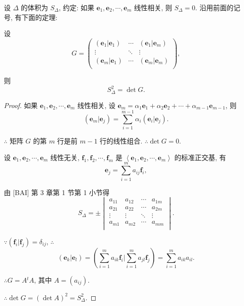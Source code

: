 \documentclass{ctexart}
\begin{document}
设 $\Delta$ 的体积为 $S_\Delta$, 约定: 如果 $\boldsymbol{e}_1,\boldsymbol{e}_2,\cdots,\boldsymbol{e}_m$ 线性相关, 则 $S_\Delta=0$. 沿用前面的记号, 有下面的定理:
\begin{theorem}\label{t2.3}
    设
    \[G=\begin{pmatrix}
        (\boldsymbol{e}_1|\boldsymbol{e}_1) & \cdots & (\boldsymbol{e}_1|\boldsymbol{e}_m) \\
        \vdots & \ddots & \vdots \\
        (\boldsymbol{e}_m|\boldsymbol{e}_1) & \cdots & (\boldsymbol{e}_m|\boldsymbol{e}_m) \\
    \end{pmatrix},\]

    则
    \[S^2_\Delta=\det G.\]
\end{theorem}
\begin{proof}
    如果 $\boldsymbol{e}_1,\boldsymbol{e}_2,\cdots,\boldsymbol{e}_m$ 线性相关, 设 $\boldsymbol{e}_m=\alpha_1\boldsymbol{e}_1+\alpha_2\boldsymbol{e}_2+\cdots+\alpha_{m-1}\boldsymbol{e}_{m-1}$, 则
    \[(\boldsymbol{e}_m|\boldsymbol{e}_j)=\sum\limits_{i=1}^{m-1}\alpha_i(\boldsymbol{e}_i|\boldsymbol{e}_j).\]
    
    $\therefore$ 矩阵 $G$ 的第 $m$ 行是前 $m-1$ 行的线性组合. $\therefore\det G=0$.

    设 $\boldsymbol{e}_1,\boldsymbol{e}_2,\cdots,\boldsymbol{e}_m$ 线性无关, $\boldsymbol{f}_1,\boldsymbol{f}_2,\cdots,\boldsymbol{f}_m$ 是 $\left<\boldsymbol{e}_1,\boldsymbol{e}_2,\cdots,\boldsymbol{e}_m\right>$ 的标准正交基, 有
    \[\boldsymbol{e}_j=\sum\limits_{i=1}^ma_{ij}\boldsymbol{f}_i,\]

    由 [BAI] 第 3 章第 1 节第 1 小节得
    \[S_\Delta=\pm\begin{vmatrix}
        a_{11} & a_{12} & \cdots & a_{1m} \\
        a_{21} & a_{22} & \cdots & a_{2m} \\
        \vdots & \vdots & \ddots & \vdots \\
        a_{m1} & a_{m2} & \cdots & a_{mm} \\
    \end{vmatrix}.\]

    $\because(\boldsymbol{f}_i|\boldsymbol{f}_j)=\delta_{ij}$, $\therefore$
    \[(\boldsymbol{e}_k|\boldsymbol{e}_l)=\left(\sum\limits_{i=1}^ma_{ik}\boldsymbol{f}_i\bigg|\sum\limits_{i=1}^ma_{jl}\boldsymbol{f}_j\right)=\sum\limits_{i=1}^ma_{ik}a_{il}.\]

    $\therefore G=A{}^tA$, 其中 $A=(a_{ij})$.

    $\therefore\det G=(\det A)^2=S_\Delta^2$.
\end{proof}
\end{document}
